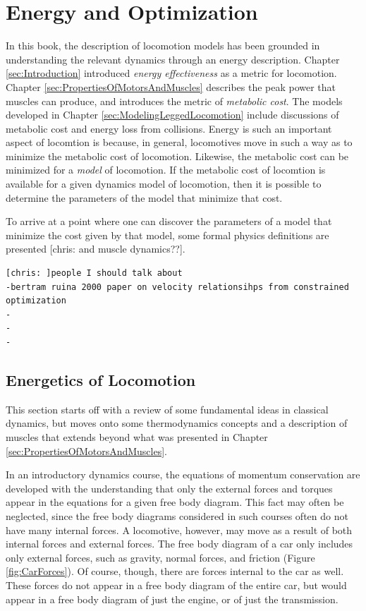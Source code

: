 \chapter{Energy and Optimization}
\label{sec:EnergyAndOptimization}

In this book, the description of locomotion models has been grounded in understanding the relevant dynamics through an energy description. Chapter \ref{sec:Introduction} introduced \textit{energy effectiveness} as a metric for locomotion. Chapter \ref{sec:PropertiesOfMotorsAndMuscles} describes the peak power that muscles can produce, and introduces the metric of \textit{metabolic cost}. The models developed in Chapter \ref{sec:ModelingLeggedLocomotion} include discussions of metabolic cost and energy loss from collisions. Energy is such an important aspect of locomtion is because, in general, locomotives move in such a way as to minimize the metabolic cost of locomotion. Likewise, the metabolic cost can be minimized for a \textit{model} of locomotion. If the metabolic cost of locomtion is available for a given dynamics model of locomotion, then it is possible to determine the parameters of the model that minimize that cost.

To arrive at a point where one can discover the parameters of a model that minimize the cost given by that model, some formal physics definitions are presented [chris: and muscle dynamics??].

\begin{verbatim}
[chris: ]people I should talk about
-bertram ruina 2000 paper on velocity relationsihps from constrained optimization
-
-
-
\end{verbatim}

\section{Energetics of Locomotion} %
\label{sec:EnergeticsOfLocomotion}

This section starts off with a review of some fundamental ideas in classical dynamics, but moves onto some thermodynamics concepts and a description of muscles that extends beyond what was presented in Chapter \ref{sec:PropertiesOfMotorsAndMuscles}.

In an introductory dynamics course, the equations of momentum conservation are developed with the understanding that only the external forces and torques appear in the equations for a given free body diagram. This fact may often be neglected, since the free body diagrams considered in such courses often do not have many internal forces. A locomotive, however, may move as a result of both internal forces and external forces. The free body diagram of a car only includes only external forces, such as gravity, normal forces, and friction (Figure \ref{fig:CarForces}). Of course, though, there are forces internal to the car as well. These forces do not appear in a free body diagram of the entire car, but would appear in a free body diagram of just the engine, or of just the transmission.

